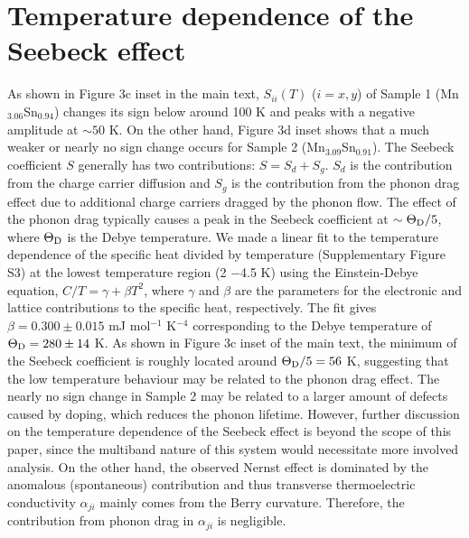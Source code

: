 \documentclass[amsmath,amssymb]{nature}
\begin{document}
	\section{Temperature dependence of the Seebeck effect}
	As shown in  Figure 3c inset in the main text, $S_{ii}(T)$ ($i = x, y$) of Sample 1 (Mn$_{3.06}$Sn$_{0.94}$) changes its sign below around 100 K and peaks with a negative amplitude at $\sim 50$ K. On the other hand, Figure 3d inset shows that a much weaker or nearly no sign change occurs for Sample 2 (Mn$_{3.09}$Sn$_{0.91}$). The Seebeck coefficient $S$ generally has two contributions: $S = S_d + S_g$. $S_d$ is the contribution from the charge carrier diffusion and $S_g$ is the contribution from the phonon drag effect due to additional charge carriers dragged by the phonon flow.
	The effect of the phonon drag typically causes a peak in the Seebeck coefficient at $\sim \Theta_{\rm D}/5$, where $\Theta_{\rm D}$ is the Debye temperature\cite{ziman1960}. We made a linear fit to the temperature dependence of the specific heat divided by temperature (Supplementary Figure S3) at the lowest temperature region (2 $-$4.5 K) using  the Einstein-Debye equation, $C/T=\gamma+\beta T^2$, where $\gamma$ and $\beta$ are the parameters for the electronic and lattice contributions to the specific heat, respectively. The fit gives $\beta=0.300 \pm 0.015$   mJ mol$^{-1}$ K$^{-4}$ corresponding to the Debye temperature of $\Theta_{\rm D}=280\pm 14$ K. As shown in Figure 3c inset of the main text, the minimum of the Seebeck coefficient is roughly located around $\Theta_{\rm D}/5 = 56$ K, suggesting that the low temperature behaviour may be related to the phonon drag effect.  The nearly no sign change in Sample 2 may be related to a larger amount of defects caused by doping, which reduces the phonon lifetime. \color{black}  However, further discussion on the temperature dependence of the Seebeck effect is beyond the scope of this paper, since the multiband nature of this system\cite{Yang2016} would necessitate more involved analysis. On the other hand, the observed Nernst effect is dominated by the anomalous (spontaneous) contribution and thus transverse thermoelectric conductivity $\alpha_{ji}$ mainly comes from the Berry curvature. Therefore, the contribution from phonon drag in $\alpha_{ji}$ is negligible.  %
	
\end{document}
